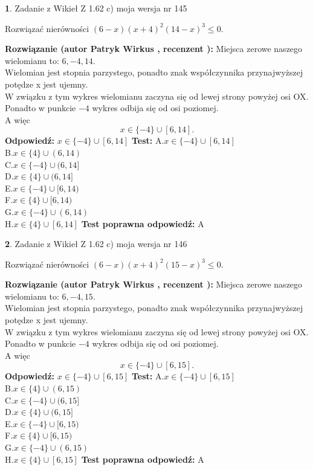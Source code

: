 \documentclass[12pt, a4paper]{article}
\theoremstyle{definition} %
\newtheorem{zad}{}
\newcommand{\zadStart}[1]{\begin{zad}#1\newline}
\newcommand{\zadStop}{\end{zad}}
\newcommand{\rozwStart}[2]{\noindent \textbf{Rozwiązanie (autor #1 , recenzent #2): }\newline}
\newcommand{\rozwStop}{\newline}
\newcommand{\odpStart}{\noindent \textbf{Odpowiedź:}\newline}
\newcommand{\odpStop}{\newline}
\newcommand{\testStart}{\noindent \textbf{Test:}\newline}
\newcommand{\testStop}{\newline}
\newcommand{\kluczStart}{\noindent \textbf{Test poprawna odpowiedź:}\newline}
\newcommand{\kluczStop}{\newline}
\begin{document}
\zadStart{Zadanie z Wikieł Z 1.62 c) moja wersja nr 145}

Rozwiązać nierówności $(6-x)(x+4)^{2}(14-x)^{3}\le0$.
\zadStop
\rozwStart{Patryk Wirkus}{}
Miejsca zerowe naszego wielomianu to: $6, -4, 14$.\\
Wielomian jest stopnia parzystego, ponadto znak współczynnika przy\linebreak najwyższej potędze x jest ujemny.\\ W związku z tym wykres wielomianu zaczyna się od lewej strony powyżej osi OX.\\
Ponadto w punkcie $-4$ wykres odbija się od osi poziomej.\\
A więc $$x \in \{-4\} \cup [6,14].$$
\rozwStop
\odpStart
$x \in \{-4\} \cup [6,14]$
\odpStop
\testStart
A.$x \in \{-4\} \cup [6,14]$\\
B.$x \in \{4\} \cup (6,14)$\\
C.$x \in \{-4\} \cup (6,14]$\\
D.$x \in \{4\} \cup (6,14]$\\
E.$x \in \{-4\} \cup [6,14)$\\
F.$x \in \{4\} \cup [6,14)$\\
G.$x \in \{-4\} \cup (6,14)$\\
H.$x \in \{4\} \cup [6,14]$
\testStop
\kluczStart
A
\kluczStop



\zadStart{Zadanie z Wikieł Z 1.62 c) moja wersja nr 146}

Rozwiązać nierówności $(6-x)(x+4)^{2}(15-x)^{3}\le0$.
\zadStop
\rozwStart{Patryk Wirkus}{}
Miejsca zerowe naszego wielomianu to: $6, -4, 15$.\\
Wielomian jest stopnia parzystego, ponadto znak współczynnika przy\linebreak najwyższej potędze x jest ujemny.\\ W związku z tym wykres wielomianu zaczyna się od lewej strony powyżej osi OX.\\
Ponadto w punkcie $-4$ wykres odbija się od osi poziomej.\\
A więc $$x \in \{-4\} \cup [6,15].$$
\rozwStop
\odpStart
$x \in \{-4\} \cup [6,15]$
\odpStop
\testStart
A.$x \in \{-4\} \cup [6,15]$\\
B.$x \in \{4\} \cup (6,15)$\\
C.$x \in \{-4\} \cup (6,15]$\\
D.$x \in \{4\} \cup (6,15]$\\
E.$x \in \{-4\} \cup [6,15)$\\
F.$x \in \{4\} \cup [6,15)$\\
G.$x \in \{-4\} \cup (6,15)$\\
H.$x \in \{4\} \cup [6,15]$
\testStop
\kluczStart
A
\kluczStop
\end{document}
